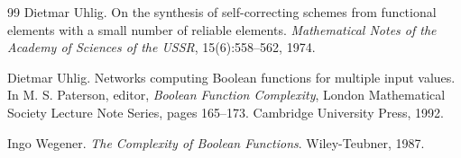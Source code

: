 \documentclass[11pt]{article}
\theoremstyle{definition}
\begin{document}
\begin{thebibliography}{99}
Dietmar Uhlig.
\newblock On the synthesis of self-correcting schemes from functional elements with a small number of reliable elements.
\newblock \emph{Mathematical Notes of the Academy of Sciences of the USSR}, 15(6):558--562, 1974.

Dietmar Uhlig.
\newblock Networks computing Boolean functions for multiple input values.
\newblock In M. S. Paterson, editor, \emph{Boolean Function Complexity}, London Mathematical Society Lecture Note Series, pages 165--173. Cambridge University Press, 1992.

Ingo Wegener.
\newblock \emph{The Complexity of Boolean Functions}.
\newblock Wiley-Teubner, 1987.

\end{thebibliography}
\end{document}
